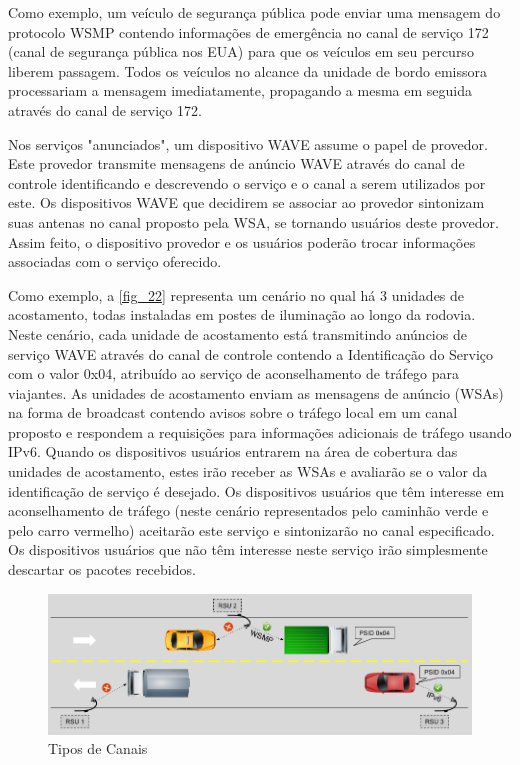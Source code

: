 \documentclass[
12pt,				%
openright,			%
oneside,			%
a4paper,			%
brazil,				%
]{abntex2}
\begin{document}
	\par Como exemplo, um veículo de segurança pública pode enviar uma mensagem do protocolo WSMP contendo informações de emergência no canal de serviço 172 (canal de segurança pública nos EUA) para que os veículos em seu percurso liberem passagem. Todos os veículos no alcance da unidade de bordo emissora processariam a mensagem imediatamente, propagando a mesma em seguida através do canal de serviço 172.
	
	\par Nos serviços "anunciados", um dispositivo WAVE assume o papel de provedor. Este provedor transmite mensagens de anúncio WAVE através do canal de controle identificando e descrevendo o serviço e o canal a serem utilizados por este. Os dispositivos WAVE que decidirem se associar ao provedor sintonizam suas antenas no canal proposto pela WSA, se tornando usuários deste provedor. Assim feito, o  dispositivo provedor e os usuários poderão trocar informações associadas com o serviço oferecido. 
	
	\par Como exemplo, a \autoref{fig_22} representa um cenário no qual há 3 unidades de acostamento, todas instaladas em postes de iluminação ao longo da rodovia. Neste cenário, cada unidade de acostamento está transmitindo anúncios de serviço WAVE através do canal de controle contendo a Identificação do Serviço com o valor 0x04, atribuído ao serviço de aconselhamento de tráfego para viajantes. As unidades de acostamento enviam as mensagens de anúncio (WSAs) na forma de broadcast contendo avisos sobre o tráfego local em um canal proposto e respondem a requisições para informações adicionais de tráfego usando IPv6. Quando os dispositivos usuários entrarem na área de cobertura das unidades de acostamento, estes irão receber as WSAs e avaliarão se o valor da identificação de serviço é desejado. Os dispositivos usuários que têm interesse em aconselhamento de tráfego (neste cenário representados pelo caminhão verde e pelo carro vermelho) aceitarão este serviço e sintonizarão no canal especificado. Os dispositivos usuários que não têm interesse neste serviço irão simplesmente descartar os pacotes recebidos.
	
	\begin{figure} [H]
		\centering
		\includegraphics[scale=.5]{figuras/cap3/22TiposDeCanais}
		\caption{\label{fig_22}Tipos de Canais}
	\end{figure}
	
\end{document}
